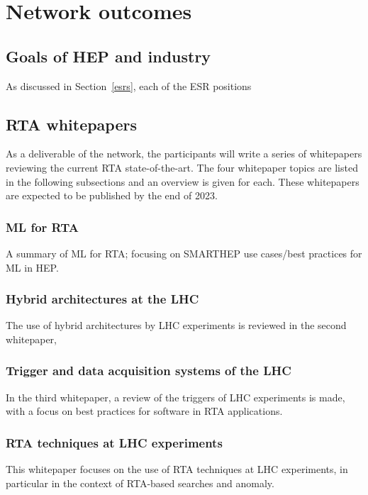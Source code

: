 \section{Network outcomes}
\label{outcomes}


\subsection{Goals of HEP and industry}
\label{goals}
As discussed in Section~\ref{esrs}, each of the ESR positions
\subsection{RTA whitepapers}
\label{whitepapers}
As a deliverable of the network, the participants will write a series of whitepapers reviewing the current RTA state-of-the-art. The four whitepaper topics are listed in the following subsections and an overview is given for each. These whitepapers are expected to be published by the end of 2023.

\subsubsection{ML for RTA}
\label{wp-ML-for-RTA}
A summary of ML for RTA; focusing on SMARTHEP use cases/best practices for ML in HEP.

\subsubsection{Hybrid architectures at the LHC}
\label{wp-hybrid-architectures-LHC}
The use of hybrid architectures by LHC experiments is reviewed in the second whitepaper, 

\subsubsection{Trigger and data acquisition systems of the LHC}
\label{wp-TDAQ-at-LHC}
In the third whitepaper, a review of the triggers of LHC experiments is made, with a focus on best practices for software in RTA applications.

\subsubsection{RTA techniques at LHC experiments}
\label{wp-RTA-at-LHC}
This whitepaper focuses on the use of RTA techniques at LHC experiments, in particular in the context of RTA-based searches and anomaly.


